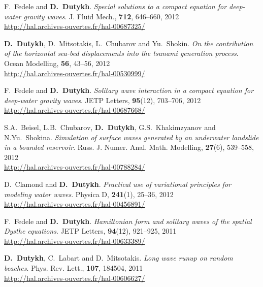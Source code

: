\begin{etaremune}

  \item F.~Fedele and \textbf{D.~Dutykh}. \textit{Special solutions to a compact equation for deep-water gravity waves}. J. Fluid Mech., \textbf{712}, 646--660, 2012 \\ %
  \url{http://hal.archives-ouvertes.fr/hal-00687325/}

  \item \textbf{D.~Dutykh}, D.~Mitsotakis, L.~Chubarov and Yu.~Shokin. \textit{On the contribution of the horizontal sea-bed displacements into the tsunami generation process}. Ocean Modelling, \textbf{56}, 43--56, 2012 \\ %
  \url{http://hal.archives-ouvertes.fr/hal-00530999/}
  
 \item F.~Fedele and \textbf{D.~Dutykh}. \textit{Solitary wave interaction in a compact equation for deep-water gravity waves}. JETP Letters, \textbf{95}(12), 703--706, 2012 \\ %
  \url{http://hal.archives-ouvertes.fr/hal-00687668/}

  \item S.A.~Beisel, L.B.~Chubarov, \textbf{D.~Dutykh}, G.S.~Khakimzyanov and N.Yu.~Shokina. \textit{Simulation of surface waves generated by an underwater landslide in a bounded reservoir}. Russ. J. Numer. Anal. Math. Modelling, \textbf{27}(6), 539--558, 2012 \\ %
  \url{http://hal.archives-ouvertes.fr/hal-00788284/}

  \item D.~Clamond and \textbf{D.~Dutykh}. \textit{Practical use of variational principles for modeling water waves}. Physica D, \textbf{241}(1), 25--36, 2012 \\ %
  \url{http://hal.archives-ouvertes.fr/hal-00456891/}


  \item F.~Fedele and \textbf{D.~Dutykh}. \textit{Hamiltonian form and solitary waves of the spatial Dysthe equations}. JETP Letters, \textbf{94}(12), 921--925, 2011 \\ %
  \url{http://hal.archives-ouvertes.fr/hal-00633389/}

  \item \textbf{D.~Dutykh}, C.~Labart and D.~Mitsotakis. \textit{Long wave runup on random beaches}. Phys. Rev. Lett., \textbf{107}, 184504, 2011 \\ %
  \url{http://hal.archives-ouvertes.fr/hal-00606627/}
  

\end{etaremune}
